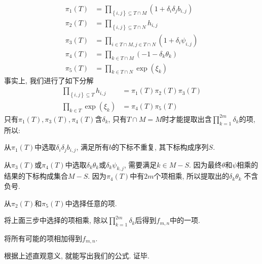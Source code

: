 \documentclass{article}
\newcommand{\sbrace}[1]{\left(#1\right)}
\newcommand{\bbrace}[1]{\left\{#1\right\}}
\begin{document}
\begin{equation}
\begin{aligned}
  \pi_1(T)&=\prod_{\bbrace{i,j}\subseteq T\cap M}\sbrace{1+\delta_i \delta_j b_{i,j}} \\
  \pi_2(T)&=\prod_{\bbrace{i,j}\subseteq T\cap N}{h_{i,j}} \\
  \pi_3(T)&=\prod_{i\in T\cap M,j\in T\cap N}\sbrace{1+\delta_i \psi_{i,j}} \\
  \pi_4(T)&=\prod_{k\in T\cap M}\sbrace{-1-\delta_k \theta_k} \\
  \pi_5(T)&=\prod_{k\in T\cap N}{\exp(\xi_k)}
\end{aligned}
\end{equation}
事实上, 我们进行了如下分解 
\begin{equation}
\begin{aligned}
  \prod_{\bbrace{i,j}\subseteq T}{h_{i,j}}&=\pi_1(T)\pi_2(T)\pi_3(T) \\ 
  \prod_{k\in T}{\exp(\xi_k)}&=\pi_4(T)\pi_5(T)
\end{aligned}
\end{equation}
只有$\pi_1(T),\pi_3(T),\pi_4(T)$含$\delta_k$, 只有$T\cap M=M$时才能提取出含$\prod_{k=1}^{2m}{\delta_k}$的项, 所以:
\begin{compactenum}[Step 1.]
\item 从$\pi_1(T)$中选取$\delta_i \delta_j b_{i,j}$, 满足所有$b$的下标不重复, 其下标构成序列$S$.
\item 从$\pi_3(T)$或$\pi_4(T)$中选取$\delta_k \theta_k$或$\delta_k \psi_{k,j}$, 需要满足$k\in M-S$. 因为最终$\theta$和$\psi$相乘的结果的下标构成集合$M-S$. 因为$\pi_4(T)$中有$2m$个项相乘, 所以提取出的$\delta_k \theta_k$ 不含负号. 
\item 从$\pi_2(T)$和$\pi_5(T)$中选择任意的项.
\item 将上面三步中选择的项相乘, 除以$\prod_{k=1}^{2m}{\delta_k}$后得到$f_{m,n}$中的一项.
\item 将所有可能的项相加得到$f_{m,n}$.
\end{compactenum}
根据上述直观意义, 就能写出我们的公式. 证毕. 
\end{document}
